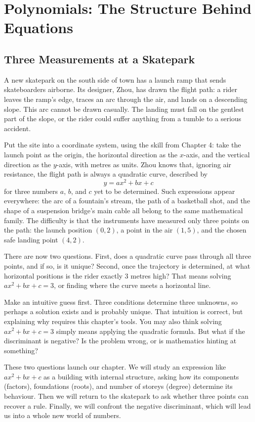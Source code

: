 \chapter{Polynomials: The Structure Behind Equations}

\section{Three Measurements at a Skatepark}

A new skatepark on the south side of town has a launch ramp that sends skateboarders airborne. Its designer, Zhou, has drawn the flight path: a rider leaves the ramp's edge, traces an arc through the air, and lands on a descending slope. This arc cannot be drawn casually. The landing must fall on the gentlest part of the slope, or the rider could suffer anything from a tumble to a serious accident.

Put the site into a coordinate system, using the skill from Chapter 4: take the launch point as the origin, the horizontal direction as the $x$-axis, and the vertical direction as the $y$-axis, with metres as units. Zhou knows that, ignoring air resistance, the flight path is always a quadratic curve, described by
\[
y = ax^2 + bx + c
\]
for three numbers $a$, $b$, and $c$ yet to be determined. Such expressions appear everywhere: the arc of a fountain's stream, the path of a basketball shot, and the shape of a suspension bridge's main cable all belong to the same mathematical family. The difficulty is that the instruments have measured only three points on the path: the launch position $(0, 2)$, a point in the air $(1, 5)$, and the chosen safe landing point $(4, 2)$.

There are now two questions. First, does a quadratic curve pass through all three points, and if so, is it unique? Second, once the trajectory is determined, at what horizontal positions is the rider exactly $3$ metres high? That means solving $ax^2+bx+c=3$, or finding where the curve meets a horizontal line.

Make an intuitive guess first. Three conditions determine three unknowns, so perhaps a solution exists and is probably unique. That intuition is correct, but explaining why requires this chapter's tools. You may also think solving $ax^2+bx+c=3$ simply means applying the quadratic formula. But what if the discriminant is negative? Is the problem wrong, or is mathematics hinting at something?

These two questions launch our chapter. We will study an expression like $ax^2+bx+c$ as a building with internal structure, asking how its components (factors), foundations (roots), and number of storeys (degree) determine its behaviour. Then we will return to the skatepark to ask whether three points can recover a rule. Finally, we will confront the negative discriminant, which will lead us into a whole new world of numbers.

